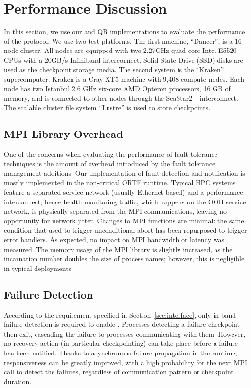 \section{Performance Discussion}\label{sec:experiments}

In this section, we use our \ompi and \abft QR implementations to evaluate the
performance of the \cof protocol. We use two test platforms. The first machine,
``Dancer'', is a 16-node cluster. All nodes are equipped with two 2.27GHz
quad-core Intel E5520 CPUs with a 20GB/s Infiniband interconnect. Solid State
Drive (SSD) disks are used as the checkpoint storage media. The second system is
the ``Kraken'' supercomputer. Kraken is a Cray XT5 machine with 9,408 compute
nodes.  Each node has two Istanbul 2.6 GHz six-core AMD Opteron processors, 16
GB of memory, and is connected to other nodes through the SeaStar2+
interconnect. The scalable cluster file system ``Lustre'' is used to store
checkpoints.

\subsection{MPI Library Overhead}

One of the concerns when evaluating the performance of fault tolerance
techniques is the amount of overhead introduced by the fault tolerance
management additions. Our implementation of fault detection and notification is
mostly implemented in the non-critical ORTE runtime. Typical HPC systems feature
a separated service network (usually Ethernet-based) and a performance
interconnect, hence health monitoring traffic, which happens on the OOB service
network, is physically separated from the MPI communications, leaving no
opportunity for network jitter. Changes to MPI functions are minimal: the same
condition that used to trigger unconditional abort has been repurposed to
trigger error handlers. As expected, no impact on MPI bandwidth or latency was
measured.
The memory usage of the MPI library is slightly increased, as the incarnation
number doubles the size of process names; however, this is negligible in typical
deployments.

\subsection{Failure Detection}\label{sec:experiments:fd}

According to the requirement specified in Section~\ref{sec:interface}, only
in-band failure detection is required to enable \cof. Processes detecting a
failure checkpoint then exit, cascading the failure to processes communicating
with them. However, no recovery action (in particular checkpointing) can take 
place before a failure has been
notified. Thanks to asynchronous failure propagation in the
runtime, responsiveness can be greatly improved, with a high probability for the
next MPI call to detect the failures, regardless of communication pattern or
checkpoint duration.

